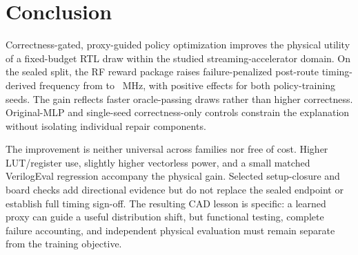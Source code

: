 \section{Conclusion}
\label{sec:conclusion}

Correctness-gated, proxy-guided policy optimization improves the physical
utility of a fixed-budget RTL draw within the studied streaming-accelerator
domain.  On the sealed split, the RF reward package raises failure-penalized
post-route timing-derived frequency from
 to
~MHz, with positive effects for both
policy-training seeds.  The gain reflects faster oracle-passing draws rather
than higher correctness.  Original-MLP and single-seed correctness-only controls
constrain the explanation without isolating individual repair components.

The improvement is neither universal across families nor free of cost.  Higher
LUT/register use, slightly higher vectorless power, and a small matched
VerilogEval regression accompany the physical gain.  Selected setup-closure
and board checks add directional evidence but do not replace the sealed
endpoint or establish full timing sign-off.  The resulting CAD lesson is
specific: a learned proxy can guide a useful distribution shift, but functional
testing, complete failure accounting, and independent physical evaluation must
remain separate from the training objective.

